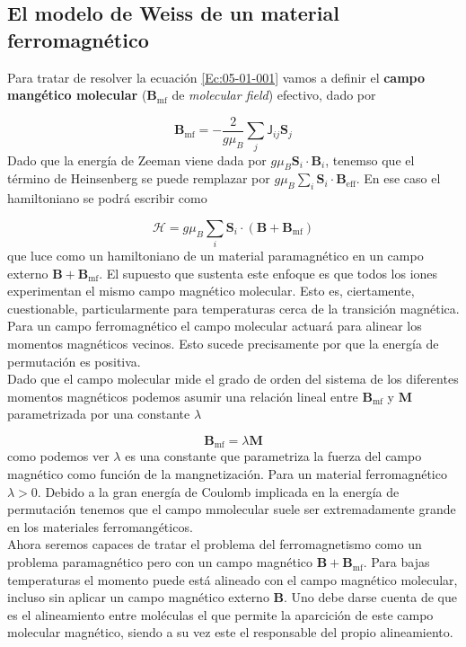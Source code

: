 \documentclass[12pt,a4paper]{book}
\numberwithin{equation}{section}
\numberwithin{figure}{section}
\newcommand{\eff}{\mathrm{eff}}
\newcommand{\mf}{\mathrm{mf}}
\newcommand{\Hcal}{\mathcal{H}}
\newcommand{\Jsf}{\mathsf{J}}
\newcommand{\Bn}{\mathbf{B}}
\newcommand{\Mn}{\mathbf{M}}
\newcommand{\Sn}{\mathbf{S}}
\begin{document}
\subsection{El modelo de Weiss de un material ferromagnético}

Para tratar de resolver la ecuación \ref{Ec:05-01-001} vamos a definir el \textbf{campo mangético molecular} ($\Bn_\mf$ de \textit{molecular field}) efectivo, dado por

\begin{equation}
    \Bn_{\mf} = -\frac{2}{g \mu_B} \sum_j \Jsf_{ij} \Sn_j \label{Ec:05-01-002}
\end{equation}
Dado que la energía de Zeeman viene dada por $g \mu_B \Sn_i \cdot \Bn_i$, tenemso que el término de Heinsenberg se puede remplazar por $g \mu_B \sum_i \Sn_i \cdot \Bn_\eff$. En ese caso el hamiltoniano se podrá escribir como

\begin{equation}
    \Hcal = g \mu_B \sum_i \Sn_i \cdot (\Bn + \Bn_\mf) \label{Ec:05-01-003}
\end{equation}
que luce como un hamiltoniano de un material paramagnético en un campo externo $\Bn + \Bn_\mf$. El supuesto que sustenta este enfoque es que todos los iones experimentan el mismo campo magnético molecular. Esto es, ciertamente, cuestionable, particularmente para temperaturas cerca de la transición magnética. Para un campo ferromagnético el campo molecular actuará para alinear los momentos magnéticos vecinos. Esto sucede precisamente por que la energía de permutación es positiva. \\

Dado que el campo molecular mide el grado de orden del sistema de los diferentes momentos magnéticos podemos asumir una relación lineal entre $\Bn_\mf$ y $\Mn$ parametrizada por una constante $\lambda$ 

\begin{equation}
    \Bn_\mf = \lambda \Mn \label{Ec:05-01-004}
\end{equation}
como podemos ver $\lambda$ es una constante que parametriza la fuerza del campo magnético como función de la mangnetización. Para un material ferromagnético $\lambda>0$. Debido a la gran energía de Coulomb implicada en la energía de permutación tenemos que el campo mmolecular suele ser extremadamente grande en los materiales ferromangéticos. \\

Ahora seremos capaces de tratar el problema del ferromagnetismo como un problema paramagnético pero con un campo magnético $\Bn+\Bn_\mf$. Para bajas temperaturas el momento puede está alineado con el campo magnético molecular, incluso sin aplicar un campo magnético externo $\Bn$. Uno debe darse cuenta de que es el alineamiento entre moléculas el que permite la aparcición de este campo molecular magnético, siendo a su vez este el responsable del propio alineamiento. \\
\end{document}
